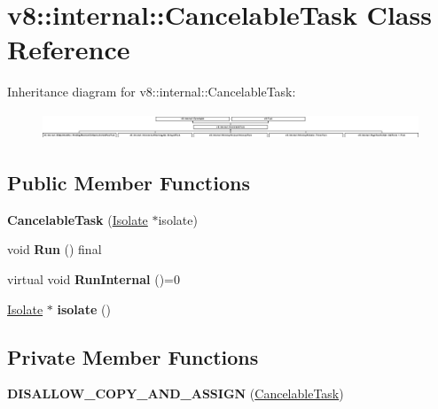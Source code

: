 \hypertarget{classv8_1_1internal_1_1_cancelable_task}{}\section{v8\+:\+:internal\+:\+:Cancelable\+Task Class Reference}
\label{classv8_1_1internal_1_1_cancelable_task}
Inheritance diagram for v8\+:\+:internal\+:\+:Cancelable\+Task\+:\begin{figure}[H]
\begin{center}
\leavevmode
\includegraphics[height=0.798100cm]{classv8_1_1internal_1_1_cancelable_task}
\end{center}
\end{figure}
\subsection*{Public Member Functions}
\begin{DoxyCompactItemize}
\item 
{\bfseries Cancelable\+Task} (\hyperlink{classv8_1_1internal_1_1_isolate}{Isolate} $\ast$isolate)\hypertarget{classv8_1_1internal_1_1_cancelable_task_aab16ea25b9ec26827f565eed805d6077}{}\label{classv8_1_1internal_1_1_cancelable_task_aab16ea25b9ec26827f565eed805d6077}

\item 
void {\bfseries Run} () final\hypertarget{classv8_1_1internal_1_1_cancelable_task_ae1851dd66f2539be51f60f2ad041af0d}{}\label{classv8_1_1internal_1_1_cancelable_task_ae1851dd66f2539be51f60f2ad041af0d}

\item 
virtual void {\bfseries Run\+Internal} ()=0\hypertarget{classv8_1_1internal_1_1_cancelable_task_a9c4f61742dcb132b5b631e7bfce3242c}{}\label{classv8_1_1internal_1_1_cancelable_task_a9c4f61742dcb132b5b631e7bfce3242c}

\item 
\hyperlink{classv8_1_1internal_1_1_isolate}{Isolate} $\ast$ {\bfseries isolate} ()\hypertarget{classv8_1_1internal_1_1_cancelable_task_a4b35101a5130800d317152cccb8448c8}{}\label{classv8_1_1internal_1_1_cancelable_task_a4b35101a5130800d317152cccb8448c8}

\end{DoxyCompactItemize}
\subsection*{Private Member Functions}
\begin{DoxyCompactItemize}
\item 
{\bfseries D\+I\+S\+A\+L\+L\+O\+W\+\_\+\+C\+O\+P\+Y\+\_\+\+A\+N\+D\+\_\+\+A\+S\+S\+I\+GN} (\hyperlink{classv8_1_1internal_1_1_cancelable_task}{Cancelable\+Task})\hypertarget{classv8_1_1internal_1_1_cancelable_task_a4dd6113bd991767c403d2c114b852807}{}\label{classv8_1_1internal_1_1_cancelable_task_a4dd6113bd991767c403d2c114b852807}

\end{DoxyCompactItemize}
